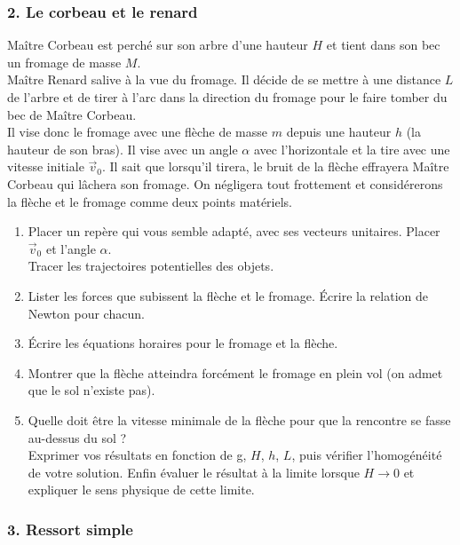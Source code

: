 \documentclass[a4paper,10pt,twoside]{article}
\newcommand{\Ressort}[4][]{
\node [minimum size=#2,#1] (ressort) at (#4) {};
\pgfmathparse{#2/#3}\let\pas\pgfmathresult
\draw [decorate,decoration={zigzag,segment length=\pas,amplitude=0.3cm}]
(ressort.east) -- (ressort.west);
}
\begin{document}
\subsubsection*{2. Le corbeau et le renard}
Maître Corbeau est perché sur son arbre d'une hauteur $H$ et tient dans son bec un fromage de masse $M$. \\
Maître Renard salive à la vue du fromage. Il décide de se mettre à une distance $L$ de l'arbre et de tirer à l'arc dans la direction du fromage pour le faire tomber du bec de Maître Corbeau. \\
Il vise donc le fromage avec une flèche de masse $m$ depuis une hauteur $h$ (la hauteur de son bras). Il vise avec un angle $\alpha$ avec l'horizontale et la tire avec une vitesse initiale $\vec v_0 $.  Il sait que lorsqu'il tirera, le bruit de la flèche effrayera Maître Corbeau qui lâchera son fromage.
On négligera tout frottement et considérerons la flèche et le fromage comme deux points matériels.
\begin{enumerate}
    \item Placer un repère qui vous semble adapté, avec ses vecteurs unitaires. Placer $\vec v_0$ et l'angle $\alpha$. \\
    Tracer les trajectoires potentielles des objets.
    \item Lister les forces que subissent la flèche et le fromage. Écrire la relation de Newton pour chacun.
    \item Écrire les équations horaires pour le fromage et la flèche. 
    \item Montrer que la flèche atteindra forcément le fromage en plein vol (on admet que le sol n'existe pas).
    \item Quelle doit être la vitesse minimale de la flèche pour que la rencontre se fasse au-dessus du sol ? \\ Exprimer vos résultats en fonction de g, $H$, $h$, $L$, puis vérifier l'homogénéité de votre solution. Enfin évaluer le résultat à la limite lorsque $ H \longrightarrow 0$ et expliquer le sens physique de cette limite.
\end{enumerate}

\subsubsection*{3. Ressort simple}

 
\end{document}
